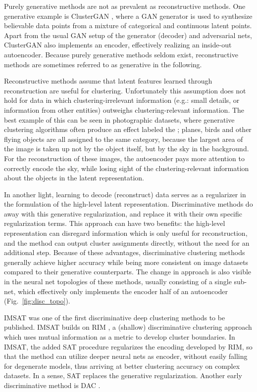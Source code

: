 			Purely generative methods are not as prevalent as reconstructive methods.
			One generative example is \ac{ClusterGAN} \cite{clustergan}, where a \ac{GAN} generator is used to synthesize believable data points from a mixture of categorical and continuous latent points.
			Apart from the usual \ac{GAN} setup of the generator (decoder) and adversarial nets, \ac{ClusterGAN} also implements an encoder, effectively realizing an inside-out autoencoder.
			Because purely generative methods seldom exist, reconstructive methods are sometimes referred to as generative in the following.
			
			Reconstructive methods assume that latent features learned through reconstruction are useful for clustering.
			Unfortunately this assumption does not hold for data in which clustering-irrelevant information (e.g.: small details, or information from other entities) outweighs clustering-relevant information.
			The best example of this can be seen in photographic datasets, where generative clustering algorithms often produce an effect labeled the ; planes, birds and other flying objects are all assigned to the same category, because the largest area of the image is taken up not by the object itself, but by the sky in the background.
			For the reconstruction of these images, the autoencoder pays more attention to correctly encode the sky, while losing sight of the clustering-relevant information about the objects in the latent representation.
			
			In another light, learning to decode (reconstruct) data serves as a regularizer in the formulation of the high-level latent representation.
			Discriminative methods do away with this generative regularization, and replace it with their own specific regularization terms.
			This approach can have two benefits: the high-level representation can disregard information which is only useful for reconstruction, and the method can output cluster assignments directly, without the need for an additional step.
			Because of these advantages, discriminative clustering methods generally achieve higher accuracy while being more consistent on image datasets compared to their generative counterparts.
			The change in approach is also visible in the neural net topologies of these methods, usually consisting of a single sub-net, which effectively only implements the encoder half of an autoencoder (Fig.~\ref{fig:disc_topo}).
			
			\ac{IMSAT} \cite{imsat} was one of the first discriminative deep clustering methods to be published.
			\ac{IMSAT} builds on \ac{RIM} \cite{rim}, a (shallow) discriminative clustering approach which uses mutual information as a metric to develop cluster boundaries.
			In \ac{IMSAT}, the added \ac{SAT} procedure regularizes the encoding developed by \ac{RIM}, so that the method can utilize deeper neural nets as encoder, without easily falling for degenerate models, thus arriving at better clustering accuracy on complex datasets.
			In a sense, \ac{SAT} replaces the generative regularization.
			Another early discriminative method is \ac{DAC} \cite{dac}.
			
